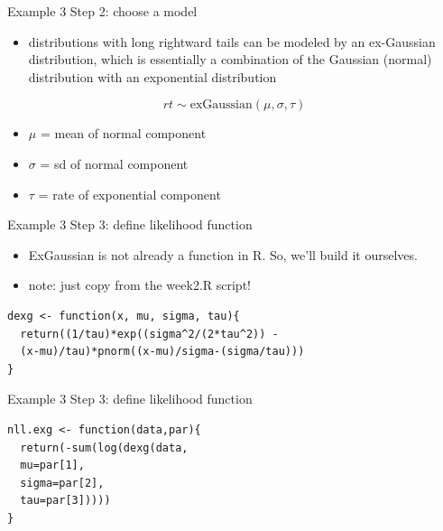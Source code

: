 \documentclass[presentation]{beamer}
\begin{document}
\begin{frame}[label=sec-27]{Example 3}
Step 2: choose a model
\begin{itemize}
\item distributions with long rightward tails can be modeled by an ex-Gaussian distribution, which is essentially a combination of the Gaussian (normal) distribution with an exponential distribution
\end{itemize}

\[
rt \sim \text{exGaussian}(\mu, \sigma, \tau)
\]

\begin{itemize}
\item $\mu$ = mean of normal component
\item $\sigma$ = sd of normal component
\item $\tau$ = rate of exponential component
\end{itemize}
\end{frame}

\begin{frame}[fragile,label=sec-28]{Example 3}
 Step 3: define likelihood function
\begin{itemize}
\item ExGaussian is not already a function in R.  So, we'll build it ourselves.
\item note: just copy from the week2.R script!
\end{itemize}

\begin{verbatim}
dexg <- function(x, mu, sigma, tau){
  return((1/tau)*exp((sigma^2/(2*tau^2)) -
  (x-mu)/tau)*pnorm((x-mu)/sigma-(sigma/tau)))
}
\end{verbatim}
\end{frame}


\begin{frame}[fragile,label=sec-29]{Example 3}
 Step 3: define likelihood function

\begin{verbatim}
nll.exg <- function(data,par){
  return(-sum(log(dexg(data, 
  mu=par[1], 
  sigma=par[2], 
  tau=par[3]))))
}
\end{verbatim}
\end{frame}
\end{document}
